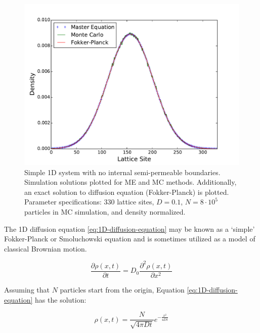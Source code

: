 	\begin{figure}[h]
		\centering
		\includegraphics[width=1.0\linewidth]{../images/1D/11U_homogeneous_plots_1D}
		\caption{Simple 1D system with no internal semi-permeable boundaries. Simulation solutions plotted for ME and MC methods. Additionally, an exact solution to diffusion equation (Fokker-Planck) is plotted. Parameter specifications: 330 lattice sites, $ D = 0.1 $, $ N = 8\cdot10^5 $ particles in MC simulation, and density normalized.}
		\label{fig:11U_homogeneous_plots_1D}
	\end{figure}
	
	\nointerlineskip The 1D diffusion equation \ref{eq:1D-diffusion-equation} may be known as a `simple' Fokker-Planck or Smoluchowski equation and is sometimes utilized as a model of classical Brownian motion.
	
	\begin{equation}
	\label{eq:1D-diffusion-equation}
		\frac{\partial\rho(x,t)}{\partial t} = D_0 \frac{\partial^2 \rho(x,t)}{\partial x^2}
	\end{equation}
	
	Assuming that $ N $ particles start from the origin, Equation \ref{eq:1D-diffusion-equation} has the solution:
	
	\begin{equation}
	\label{eq:1D-diffusion-equation-solution}
		\rho(x,t)=\frac{N}{\sqrt{4\pi Dt}}e^{-\frac{x^2}{4Dt}}
	\end{equation}	
	
